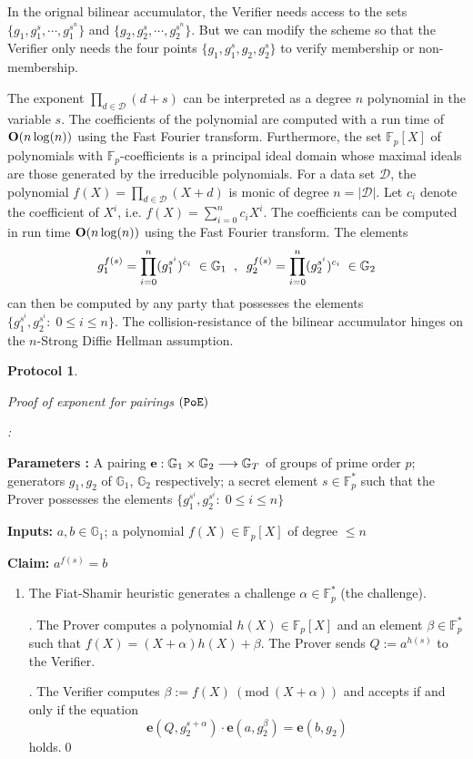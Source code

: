 \documentclass[11pt, lettersize, notitlepage, leqno, footskip=0.6cm]{article}
\newcommand{\bFp}{\mathbb{F}_p}
\newcommand{\lra}{\longrightarrow}
\newcommand{\mc}{\mathcal}
\newcommand{\mb}{\mathbb}
\newcommand{\al}{\alpha}
\newcommand{\be}{\beta}
\newcommand{\vs}{\vspace{-2mm}}
\newcommand{\Mod}[1]{\ (\mathrm{mod}\ #1)}
\newtheorem{Prot}[Thm]{Protocol}
\numberwithin{equation}{section}
\begin{document}
In the orignal bilinear accumulator, the Verifier needs access to the sets $\{g_1, g_1^s,\cdots , g_1^{s^n}\}$ and $\{g_2, g_2^s,\cdots , g_2^{s^n}\}$. But we can modify the scheme so that the Verifier only needs the four points $\{g_1,g_1^s, g_2, g_2^s \}$ to verify membership or non-membership.

The exponent $\prod\limits_{d\in \mc{D}} (d+s)$ can be interpreted as a degree $n$ polynomial in the variable $s$. The coefficients of the polynomial are computed with a run time of ${\bf{O}} (n\log(n))$ using the Fast Fourier transform. Furthermore, the set $\bFp[X]$ of polynomials with $\bFp$-coefficients is a principal ideal domain whose maximal ideals are those generated by the irreducible polynomials. For a data set $\mc{D}$, the polynomial $f(X) = \prod\limits_{d\in \mc{D}}(X+d)$ is monic of degree $n = |\mc{D}|$. Let $c_i$ denote the coefficient of $X^i$, i.e. $f(X) = \sum\limits_{i=0}^n c_iX^i$. The coefficients can be computed in run time ${\bf{O}}(n\log(n))$ using the Fast Fourier transform. The elements \vs $$g_1^{f(s)} = \prod\limits_{i=0}^n (g_1^{s^i})^{c_i}\;\in\mb{G}_1\;\;,\;\;g_2^{f(s)} = \prod\limits_{i=0}^n (g_2^{s^i})^{c_i}\;\in\mb{G}_2 \vs $$ can then be computed by any party that possesses the elements $\{g_1^{s^i}, g_2^{s^i} :\; 0\leq i \leq n  \}$. The collision-resistance of the bilinear accumulator hinges on the $n$-Strong Diffie Hellman assumption. 


\begin{Prot} \hypertarget{PoE}{ \textit{Proof of exponent for pairings} $(\tt{PoE})$}:\end{Prot} \vspace{-0.3cm}

\noindent \textbf{Parameters :} A pairing ${\bf{e}}: \mb{G}_1\times \mb{G}_2\lra \mb{G}_T$ of groups of prime order $p$; generators $g_1, g_2$ of $\mb{G}_1$, $\mb{G}_2$ respectively; a secret element $s\in \bFp^*$ such that the Prover possesses the elements $\{g_1^{s^i}, g_2^{s^i}:\; 0\leq i\leq n \}$ 

\noindent \textbf{Inputs:} $a,b\in \mb{G}_1$; a polynomial $f(X)\in \bFp[X]$ of degree $\leq n$

\noindent \textbf{Claim:} $a^{f(s)} = b$

\begin{enumerate}[wide, labelwidth=!, labelindent=0pt] \vs \item The Fiat-Shamir heuristic generates a challenge $\al\in \bFp^*$ (the challenge).

. The Prover computes a polynomial $h(X)\in  \bFp[X]$ and an element $\be\in \bFp^*$ such that $f(X) = (X+\al)h(X)+ \be$. The Prover sends $Q:= a^{h(s)}$ to the Verifier.

. The Verifier computes $\be:= f(X)\Mod{(X+\al)}$ and accepts if and only if the equation \vs $$\mathbf{e}(Q, g_2^{s+\al})\cdot\mathbf{e}(a, g_2^{\be})  = \mathbf{e}(b, g_2)$$ holds.\qed \end{enumerate}
\end{document}
